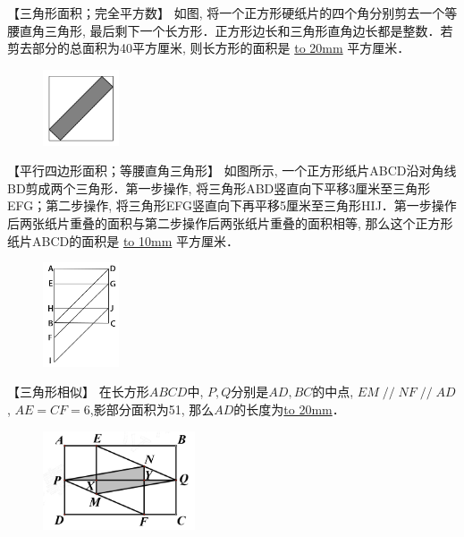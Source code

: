 \item {
    【三角形面积；完全平方数】
    {如图, 将一个正方形硬纸片的四个角分别剪去一个等腰直角三角形, 最后剩下一个长方形．正方形边长和三角形直角边长都是整数．若剪去部分的总面积为40平方厘米, 则长方形的面积是 \underline{\hbox to 20mm{}} 平方厘米．} 
    \begin{figure}[H] 
        \centering
        \includegraphics[width=0.2\textwidth]{./pics/Chapter_2/12.png}
    \end{figure}
    \vspace{1cm}
}

\item {
    【平行四边形面积；等腰直角三角形】
    {如图所示, 一个正方形纸片ABCD沿对角线BD剪成两个三角形．第一步操作, 将三角形ABD竖直向下平移3厘米至三角形EFG；第二步操作, 将三角形EFG竖直向下再平移5厘米至三角形HIJ．第一步操作后两张纸片重叠的面积与第二步操作后两张纸片重叠的面积相等, 那么这个正方形纸片ABCD的面积是 \underline{\hbox to 10mm{}} 平方厘米．} 
    \begin{figure}[H] 
        \centering
        \includegraphics[width=0.2\textwidth]{./pics/Chapter_2/10.png}
    \end{figure}
    \vspace{1cm}
}

\item {
    【三角形相似】
    在长方形$ABCD$中, $P,Q$分别是$AD,BC$的中点, $EM\mathop{//}NF\mathop{//}AD$, $AE=CF=6$,影部分面积为51, 那么$AD$的长度为\underline{\hbox to 20mm{}}．
    \begin{figure}[H] 
        \centering
        \includegraphics[width=0.4\textwidth]{./pics/Chapter_2/1.png}
    \end{figure}
    \vspace{1cm}
}

